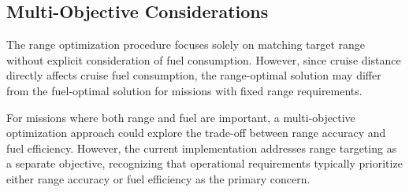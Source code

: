 \subsection{Multi-Objective Considerations}

The range optimization procedure focuses solely on matching target range without explicit consideration of fuel consumption. However, since cruise distance directly affects cruise fuel consumption, the range-optimal solution may differ from the fuel-optimal solution for missions with fixed range requirements.

For missions where both range and fuel are important, a multi-objective optimization approach could explore the trade-off between range accuracy and fuel efficiency. However, the current implementation addresses range targeting as a separate objective, recognizing that operational requirements typically prioritize either range accuracy or fuel efficiency as the primary concern.
